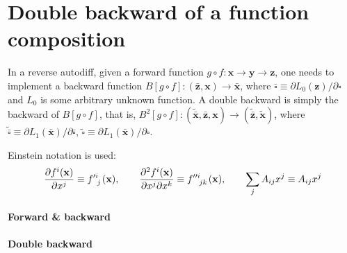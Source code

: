 \documentclass{article}
\begin{document}
\section*{Double backward of a function composition}

In a reverse autodiff, given a forward function $g\circ f:\mathbf x\rightarrow \mathbf y\rightarrow \mathbf z$, one needs to implement a backward function $B[g\circ f]:(\bar{\mathbf z},\mathbf x)\rightarrow\bar{\mathbf x}$, where $\bar\square\equiv{\partial L_0(\mathbf z)}/{\partial \square}$ and $L_0$ is some arbitrary unknown function.
A double backward is simply the backward of $B[g\circ f]$, that is, $B^2[g\circ f]:(\tilde{\bar{\mathbf x}},\bar{\mathbf z},\mathbf x)\rightarrow(\tilde{\bar{\mathbf z}},\tilde{\mathbf x})$, where $\tilde{\bar \square}\equiv{\partial L_1(\bar{\mathbf x})}/{\partial\bar\square}$, $\tilde\square\equiv{\partial L_1(\bar{\mathbf x})}/{\partial\square}$.

Einstein notation is used:
$$
\frac{\partial f^i(\mathbf x)}{\partial x^j}\equiv f\indices{^\prime^i_j}(\mathbf x),\qquad
\frac{\partial^2f^i(\mathbf x)}{\partial x^j\partial x^k}\equiv f\indices{^{\prime\prime}^i_{jk}}(\mathbf x),\qquad
\sum_j A_{ij}x^j\equiv A_{ij}x^j
$$

\paragraph{Forward \& backward}


\paragraph{Double backward}

\end{document}
